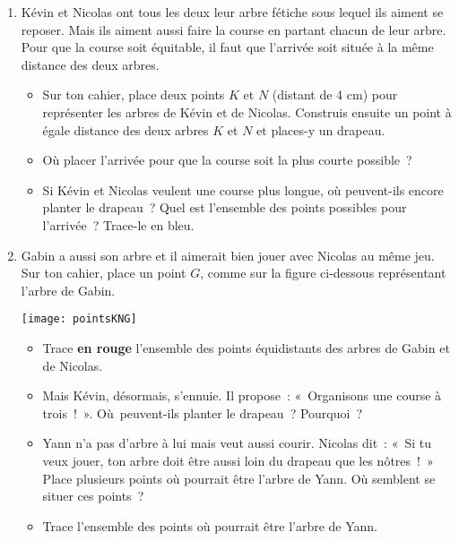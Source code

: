 \begin{exercice}
\begin{enumerate}
 \item Kévin et Nicolas ont tous les deux leur arbre fétiche sous lequel ils aiment se reposer. Mais ils aiment aussi faire la course en partant chacun de leur arbre. Pour que la course soit équitable, il faut que l'arrivée soit située à la même distance des deux arbres.
 \begin{itemize}
  \item Sur ton cahier, place deux points $K$ et $N$ (distant de 4 cm) pour représenter les arbres de Kévin et de Nicolas. Construis ensuite un point à égale distance des deux arbres $K$ et $N$ et places-y un drapeau.
  \item Où placer l'arrivée pour que la course soit la plus courte possible ?
  \item Si Kévin et Nicolas veulent une course plus longue, où peuvent-ils encore planter le drapeau ? Quel est l'ensemble des points possibles pour l'arrivée ? Trace-le en bleu. 
  \end{itemize}
 \item Gabin a aussi son arbre et il aimerait bien jouer avec Nicolas au même jeu. Sur ton cahier, place un point $G$, comme sur la figure ci-dessous représentant l'arbre de Gabin.
 \begin{center} \texttt{[image: pointsKNG]} \end{center}
 \begin{itemize}
  \item Trace \textbf{\textcolor{B2}{en rouge}} l'ensemble des points équidistants des arbres de Gabin et de Nicolas.
  \item Mais Kévin, désormais, s'ennuie. Il propose : « Organisons une course à trois ! ». Où peuvent-ils planter le drapeau ? Pourquoi ? 
  \item Yann n'a pas d'arbre à lui mais veut aussi courir. Nicolas dit : « Si tu veux jouer, ton arbre doit être aussi loin du drapeau que les nôtres ! » Place plusieurs points où pourrait être l'arbre de Yann. Où semblent se situer ces points ? 
  \item Trace l'ensemble des points où pourrait être l'arbre de Yann.
  \end{itemize}
 \end{enumerate}
\end{exercice}
